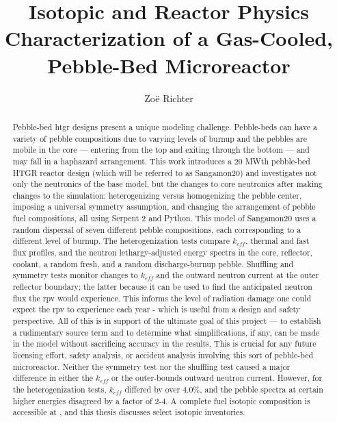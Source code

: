 \documentclass[edeposit,fullpage]{uiucthesis2018}
\title{Isotopic and Reactor Physics Characterization of a Gas-Cooled, Pebble-Bed Microreactor}
\author{Zo{\"e} Richter}
\begin{document}
\maketitle

\frontmatter
\begin{abstract}
Pebble-bed \acrfull{htgr} designs present a unique modeling challenge.  Pebble-beds can have a variety of pebble compositions due to varying levels of burnup and the pebbles are mobile in the core --- entering from the top and exiting through the bottom --- and may fall in a haphazard arrangement.  This work introduces a 20 MWth pebble-bed HTGR reactor design (which will be referred to as Sangamon20) and investigates not only the neutronics of the base model, but the changes to core neutronics after making changes to the simulation: heterogenizing versus homogenizing the pebble center, imposing a universal symmetry assumption, and changing the arrangement of pebble fuel compositions, all using Serpent 2 and Python.  This model of Sangamon20 uses a random dispersal of seven different pebble compositions, each corresponding to a different level of burnup.  The heterogenization tests compare $k_{eff}$, thermal and fast flux profiles, and the neutron lethargy-adjusted energy spectra in the core, reflector, coolant, a random fresh, and a random discharge-burnup pebble.  Shuffling and symmetry tests monitor changes to $k_{eff}$ and the outward neutron current at the outer reflector boundary; the latter because it can be used to find the anticipated neutron flux the \acrfull{rpv} would experience.  This informs the level of radiation damage one could expect the \acrshort{rpv} to experience each year - which is useful from a design and safety perspective.  All of this is in support of the ultimate goal of this project --- to establish a rudimentary source term and to determine what simplifications, if any, can be made in the model without sacrificing accuracy in the results.  This is crucial for any future licensing effort, safety analysis, or accident analysis involving this sort of pebble-bed microreactor.  Neither the symmetry test nor the shuffling test caused a major difference in either the $k_{eff}$ or the outer-bounds outward neutron current.  However, for the heterogenization tests, $k_{eff}$ differed by over 4.0\%, and the pebble spectra at certain higher energies disagreed by a factor of 2-4.  A complete fuel isotopic composition is accessible at \cite{richter_isotopic_2021}, and this thesis discusses select isotopic inventories.

\end{abstract}
\end{document}
